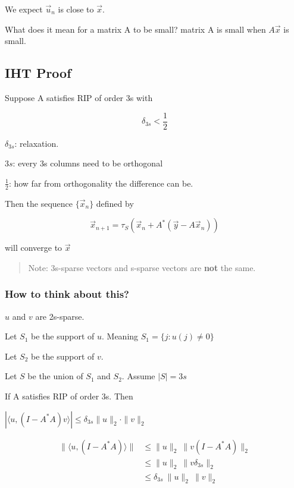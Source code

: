 \documentclass[11pt]{article}
\begin{document}
We expect \(\vec u_n\) is close to \(\vec x\).

What does it mean for a matrix A to be small? matrix A is small when \(A \vec x\)
is small.

\subsection{IHT Proof}
\label{sec:orgfdc72b6}

Suppose A satisfies RIP of order 3s with

$$
\delta_{3s} < \frac{1}{2}
$$

\(\delta_{3s}\):  relaxation.

\(3s\): every 3s columns need to be orthogonal

\(\frac{1}{2}\): how far from orthogonality the difference can be.

Then the sequence \(\{\vec x_n\}\) defined by

$$
\vec x_{n + 1} = \tau_S (\vec x_n + A^* (\vec y - A \vec x_n))
$$

will converge to \(\vec x\)

\begin{quote}
Note: 3s-sparse vectors and s-sparse vectors are \textbf{not} the same.
\end{quote}

\subsubsection{How to think about this?}
\label{sec:orgdcf21eb}

\(u\) and \(v\) are 2s-sparse.

Let \(S_1\) be the support of \(u\). Meaning \(S_1 = \{j: u(j) \neq 0\}\)

Let \(S_2\) be the support of \(v\).

Let \(S\) be the union of \(S_1\) and \(S_2\). Assume \(|S| = 3s\)

If A satisfies RIP of order 3s. Then

\(|\langle u, (I - A^* A)v \rangle| \leq \delta_{3s} \|u\|_2 \cdot \|v\|_2\)

\begin{subequations}
\label{first:main}
\begin{align}
\|\langle u, (I - A^* A) \rangle\| & \leq  \|u\|_2 \ \|v(I - A^* A)\|_2\\
& \leq \|u\|_2 \ \|v \delta_{3s}\|_2\\
& \leq \delta_{3s} \ \|u\|_2 \ \|v\|_2
\end{align}
\end{subequations}
\end{document}
